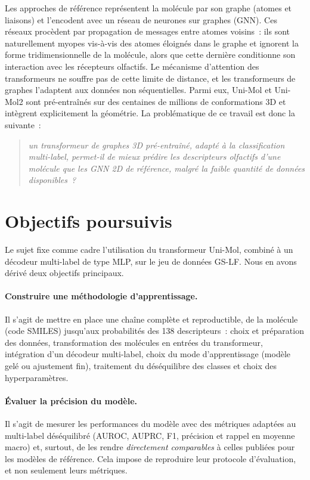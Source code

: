 Les approches de référence \cite{SanchezLengeling-2019, Lee-2023} représentent la molécule par son graphe (atomes et liaisons) et l'encodent avec un réseau de neurones sur graphes (GNN).
Ces réseaux procèdent par propagation de messages entre atomes voisins~: ils sont naturellement myopes vis-à-vis des atomes éloignés dans le graphe et ignorent la forme tridimensionnelle de la molécule, alors que cette dernière conditionne son interaction avec les récepteurs olfactifs.
Le mécanisme d'attention des transformeurs \cite{Vaswani-2017} ne souffre pas de cette limite de distance, et les transformeurs de graphes \cite{Shehzad-2024, Kim-2022} l'adaptent aux données non séquentielles.
Parmi eux, Uni-Mol \cite{Zhou-2023} et Uni-Mol2 \cite{Ji-2024} sont pré-entraînés sur des centaines de millions de conformations 3D et intègrent explicitement la géométrie.
La problématique de ce travail est donc la suivante~:
\begin{quote}
   \emph{un transformeur de graphes 3D pré-entraîné, adapté à la classification multi-label, permet-il de mieux prédire les descripteurs olfactifs d'une molécule que les GNN 2D de référence, malgré la faible quantité de données disponibles~?}
\end{quote}


\section{Objectifs poursuivis}
\label{sec:Objectifs}

Le sujet fixe comme cadre l'utilisation du transformeur Uni-Mol, combiné à un décodeur multi-label de type MLP, sur le jeu de données GS-LF.
Nous en avons dérivé deux objectifs principaux.

\paragraph{Construire une méthodologie d'apprentissage.}
Il s'agit de mettre en place une chaîne complète et reproductible, de la molécule (code SMILES) jusqu'aux probabilités des 138 descripteurs~:
choix et préparation des données, transformation des molécules en entrées du transformeur, intégration d'un décodeur multi-label, choix du mode d'apprentissage (modèle gelé ou ajustement fin), traitement du déséquilibre des classes et choix des hyperparamètres.

\paragraph{Évaluer la précision du modèle.}
Il s'agit de mesurer les performances du modèle avec des métriques adaptées au multi-label déséquilibré (AUROC, AUPRC, F1, précision et rappel en moyenne macro) et, surtout, de les rendre \emph{directement comparables} à celles publiées pour les modèles de référence.
Cela impose de reproduire leur protocole d'évaluation, et non seulement leurs métriques.

